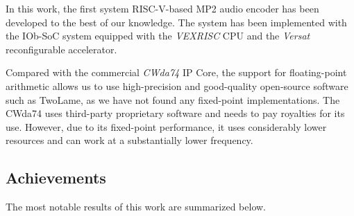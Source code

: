 
In this work, the first system RISC-V-based MP2 audio encoder has been developed to the best of our knowledge. The system has been implemented with the IOb-SoC system equipped with the \textit{VEXRISC} CPU and the \textit{Versat} reconfigurable accelerator.

Compared with the commercial \textit{CWda74} IP Core, the support for floating-point arithmetic allows us to use high-precision and good-quality open-source software such as TwoLame, as we have not found any fixed-point implementations. The CWda74 uses third-party proprietary software and needs to pay royalties for its use. However, due to its fixed-point performance, it uses considerably lower resources and can work at a substantially lower frequency.


\subsection{Achievements}

The most notable results of this work are summarized below.


